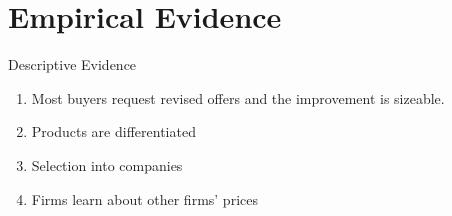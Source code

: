 \documentclass[10pt,aspectratio=169]{beamer}
\begin{document}

\section{Empirical Evidence}
 
\begin{frame}{Descriptive Evidence}\label{slide:Descriptive_evidence}

\begin{enumerate}
    \item Most buyers request revised offers and the improvement is sizeable. \hyperlink{slide:fig1}{} 
    \item Products are differentiated \hyperlink{slide:fig2}{} 
    \item Selection into companies \hyperlink{slide:fig3}{}
    \item Firms learn about other firms' prices  \hyperlink{slide:fig4}{} 
\end{enumerate}
\end{frame}
\end{document}
